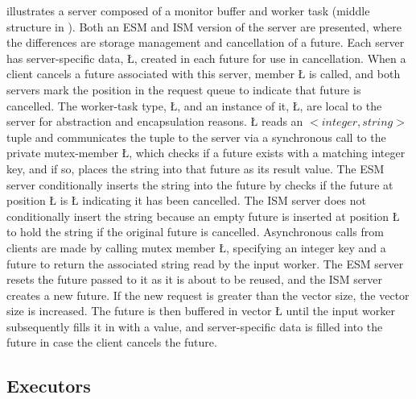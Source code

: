 \documentclass[openright,twoside]{report}
\begin{document}
 illustrates a server composed of a monitor buffer and worker task (middle structure in ).
Both an ESM and ISM version of the server are presented, where the differences are storage management and cancellation of a future.
Each server has server-specific data, \LGinlinetrue\LGbegin\lgrinde\L{}\endlgrinde\LGend{}, created in each future for use in cancellation.
When a client cancels a future associated with this server, member \LGinlinetrue\LGbegin\lgrinde\L{}\endlgrinde\LGend{} is called, and both servers mark the position in the request queue to indicate that future is cancelled.
The worker-task type, \LGinlinetrue\LGbegin\lgrinde\L{}\endlgrinde\LGend{}, and an instance of it, \LGinlinetrue\LGbegin\lgrinde\L{}\endlgrinde\LGend{}, are local to the server for abstraction and encapsulation reasons.
\LGinlinetrue\LGbegin\lgrinde\L{}\endlgrinde\LGend{} reads an $<integer, string>$ tuple and communicates the tuple to the server via a synchronous call to the private mutex-member \LGinlinetrue\LGbegin\lgrinde\L{}\endlgrinde\LGend{}, which checks if a future exists with a matching integer key, and if so, places the string into that future as its result value.
The ESM server conditionally inserts the string into the future by checks if the future at position \LGinlinetrue\LGbegin\lgrinde\L{}\endlgrinde\LGend{} is \LGinlinetrue\LGbegin\lgrinde\L{}\endlgrinde\LGend{} indicating it has been cancelled.
The ISM server does not conditionally insert the string because an empty future is inserted at position \LGinlinetrue\LGbegin\lgrinde\L{}\endlgrinde\LGend{} to hold the string if the original future is cancelled.
Asynchronous calls from clients are made by calling mutex member \LGinlinetrue\LGbegin\lgrinde\L{}\endlgrinde\LGend{}, specifying an integer key and a future to return the associated string read by the input worker.
The ESM server resets the future passed to it as it is about to be reused, and the ISM server creates a new future.
If the new request is greater than the vector size, the vector size is increased.
The future is then buffered in vector \LGinlinetrue\LGbegin\lgrinde\L{}\endlgrinde\LGend{} until the input worker subsequently fills it in with a value, and server-specific data is filled into the future in case the client cancels the future.


\subsection{Executors}
\end{document}
